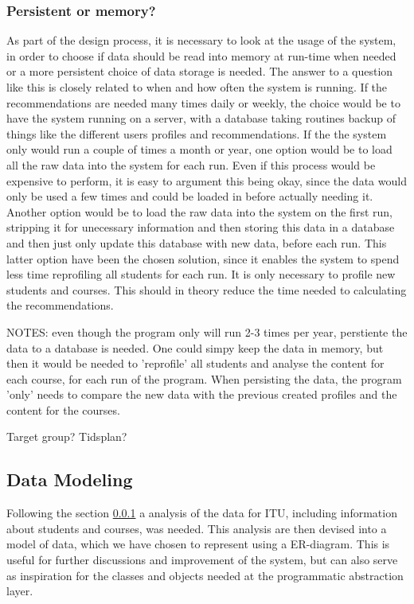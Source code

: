 \subsubsection{Persistent or memory?}
\label{subsec:persistent}
As part of the design process, it is necessary to look at the usage of the system, in order to choose if data should be read into memory at run-time when needed or a more persistent choice of data storage is needed. The answer to a question like this is closely related to when and how often the system is running. If the recommendations are needed many times daily or weekly, the choice would be to have the system running on a server, with a database taking routines backup of things like the different users profiles and recommendations. If the the system only would run a couple of times a month or year, one option would be to load all the raw data into the system for each run. Even if this process would be expensive to perform, it is easy to argument this being okay, since the data would only be used a few times and could be loaded in before actually needing it. Another option would be to load the raw data into the system on the first run, stripping it for unecessary information and then storing this data in a database and then just only update this database with new data, before each run. This latter option have been the chosen solution, since it enables the system to spend less time reprofiling all students for each run. It is only necessary to profile new students and courses. This should in theory reduce the time needed to calculating the recommendations.

NOTES:
even though the program only will run 2-3 times per year, perstiente the data to a database is needed. One could simpy keep the data in memory, but then it would be needed to 'reprofile' all students and analyse the content for each course, for each run of the program. When persisting the data, the program 'only' needs to compare the new data with the previous created profiles and the content for the courses.


Target group?
Tidsplan?
\subsection{Data Modeling}
Following the section \ref{subsec:persistent} a analysis of the data for ITU, including information about students and courses, was needed. This analysis are then devised into a model of data, which we have chosen to represent using a ER-diagram. This is useful for further discussions and improvement of the system, but can also serve as inspiration for the classes and objects needed at the programmatic abstraction layer. 

